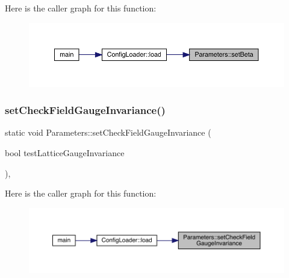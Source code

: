 Here is the caller graph for this function\+:
\nopagebreak
\begin{figure}[H]
\begin{center}
\leavevmode
\includegraphics[width=350pt]{class_parameters_a8462149cb29ecf936f1f9945f5de4908_icgraph}
\end{center}
\end{figure}
\mbox{\label{class_parameters_ad6a40d1cf972c0f1379cf011bb7da2b1}} 
\subsubsection{\texorpdfstring{setCheckFieldGaugeInvariance()}{setCheckFieldGaugeInvariance()}}
{\footnotesize\ttfamily static void Parameters\+::set\+Check\+Field\+Gauge\+Invariance (\begin{DoxyParamCaption}\item[{bool}]{test\+Lattice\+Gauge\+Invariance }\end{DoxyParamCaption})\hspace{0.3cm}{\ttfamily [inline]}, {\ttfamily [static]}}

Here is the caller graph for this function\+:
\nopagebreak
\begin{figure}[H]
\begin{center}
\leavevmode
\includegraphics[width=350pt]{class_parameters_ad6a40d1cf972c0f1379cf011bb7da2b1_icgraph}
\end{center}
\end{figure}
\mbox{\label{class_parameters_a4863c437df48cd3242fdb67221a3d6ed}} 
